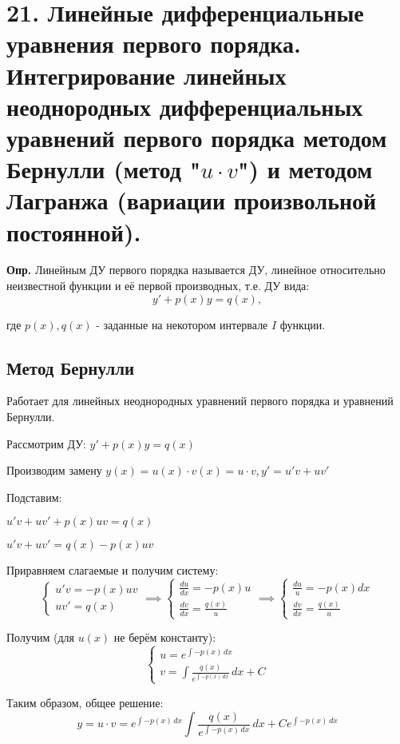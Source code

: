 \documentclass[11pt]{article}
\begin{document}
\section*{21. Линейные дифференциальные уравнения первого порядка. Интегрирование линейных неоднородных дифференциальных уравнений первого порядка методом Бернулли (метод "$u \cdot v$") и методом Лагранжа (вариации произвольной постоянной).}
\par\textbf{Опр.} Линейным ДУ первого порядка называется ДУ, линейное относительно неизвестной функции и её первой производных, т.е. ДУ вида:
$$y' + p(x)y = q(x),$$
\par где $p(x), q(x)$ - заданные на некотором интервале $I$ функции.
\subsection*{Метод Бернулли}
\par Работает для линейных неоднородных уравнений первого порядка и уравнений Бернулли.
\par Рассмотрим ДУ: $y' + p(x)y = q(x)$
\par Производим замену $y(x) = u(x) \cdot v(x) = u \cdot v, y' = u'v + uv'$
\par Подставим:
\par $u'v + uv' + p(x)uv = q(x)$
\par $u'v + uv' = q(x) - p(x)uv$
\par Приравняем слагаемые и получим систему: $$\left\{\begin{array}{l}
u'v = -p(x)uv \\
uv' = q(x)
\end{array}\right. \implies
\left\{\begin{array}{l}
\frac{du}{dx} = -p(x)u \\
\frac{dv}{dx} = \frac{q(x)}{u}
\end{array}\right. \implies
\left\{\begin{array}{l}
\frac{du}{u} = -p(x)dx \\
\frac{dv}{dx} = \frac{q(x)}{u}
\end{array}\right.$$
\par Получим (для $u(x)$ не берём константу): $$\left\{\begin{array}{l}
u = e^{\int -p(x) \, dx}  \\
v = \int \frac{q(x)}{e^{\int -p(x) \, dx}} \, dx + C
\end{array}\right.$$
\par Таким образом, общее решение: $$y = u \cdot v = e^{\int -p(x) \, dx}\int \frac{q(x)}{e^{\int -p(x) \, dx}} \, dx + C e^{\int -p(x) \, dx}$$
\end{document}
